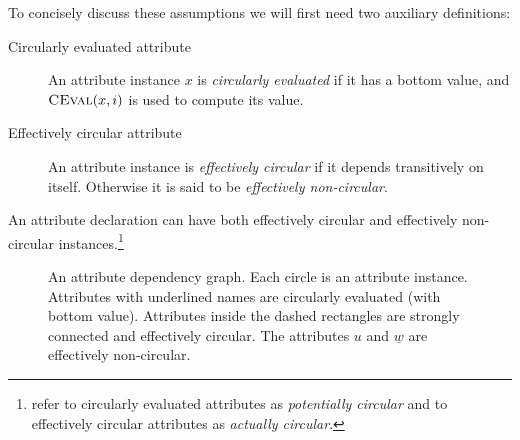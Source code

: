 {To concisely discuss these assumptions we will first need two auxiliary definitions:

\begin{description}
  \item[Circularly evaluated attribute]
    An attribute instance $x$ is \emph{circularly evaluated} if it has a bottom value,
    and $\textsc{CEval}(x, i)$ is used to compute its value.

  \item[Effectively circular attribute]
    An attribute instance is \emph{effectively circular} if it depends transitively on itself.
    Otherwise it is said to be \emph{effectively non-circular}.
\end{description}

An attribute declaration can have both effectively circular and effectively non-circular
instances.\footnote{\textcite{DBLP:journals/entcs/MagnussonH03} refer to circularly evaluated
attributes as \emph{potentially circular} and to effectively circular attributes as \emph{actually
circular}.}

\begin{figure}
  \centering
  \caption{
    An attribute dependency graph.
    Each circle is an attribute instance.
    Attributes with underlined names are circularly evaluated (with bottom value).
    Attributes inside the dashed rectangles are strongly connected
    and effectively circular.
    The attributes $u$ and $\underline{w}$ are effectively non-circular.
  }
  \label{fig:attr-graph}
\end{figure}

}
